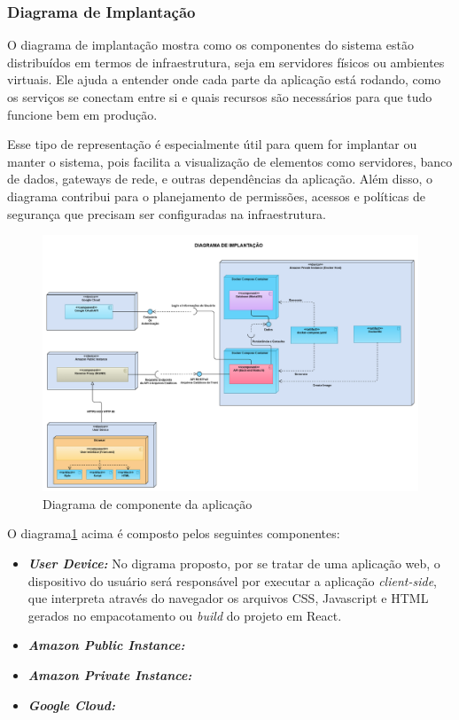 \subsubsection{Diagrama de Implantação}

O diagrama de implantação mostra como os componentes do sistema estão distribuídos em termos de infraestrutura, seja em servidores físicos ou ambientes virtuais. Ele ajuda a entender onde cada parte da aplicação está rodando, como os serviços se conectam entre si e quais recursos são necessários para que tudo funcione bem em produção.

Esse tipo de representação é especialmente útil para quem for implantar ou manter o sistema, pois facilita a visualização de elementos como servidores, banco de dados, gateways de rede, e outras dependências da aplicação. Além disso, o diagrama contribui para o planejamento de permissões, acessos e políticas de segurança que precisam ser configuradas na infraestrutura.

\begin{figure}[htb]
  \centering
  \includegraphics[width=\textwidth]{cap04-desenvolvimento/images/4-3-2-2-diagrama-implantacao}
  \caption{Diagrama de componente da aplicação}
  \label{fig:diagrama-implantacao}
\end{figure}

O diagrama\ref{fig:diagrama-implantacao} acima é composto pelos seguintes componentes:
\begin{itemize}
  \item \textbf{\textit{User Device:}} No digrama proposto, por se tratar de uma aplicação web, o dispositivo do usuário será responsável por executar a aplicação \textit{client-side}, que interpreta através do navegador os arquivos CSS, Javascript e HTML gerados no empacotamento ou \textit{build} do projeto em React. 
  \item \textbf{\textit{Amazon Public Instance:}}
  \item \textbf{\textit{Amazon Private Instance:}}
  \item \textbf{\textit{Google Cloud:}}
\end{itemize}


